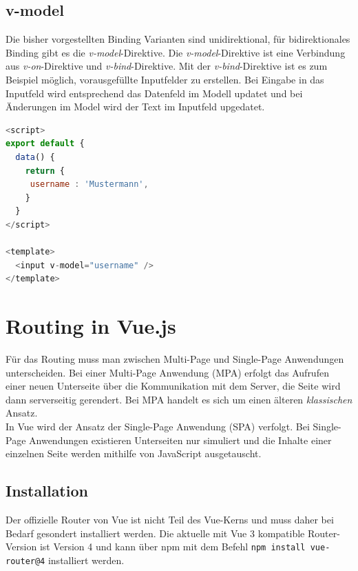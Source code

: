 
\subsection*{v-model}
Die bisher vorgestellten Binding Varianten sind unidirektional,
für bidirektionales Binding gibt es die \emph{v-model}-Direktive.
Die \emph{v-model}-Direktive ist eine Verbindung aus \emph{v-on}-Direktive
und \emph{v-bind}-Direktive.
Mit der \emph{v-bind}-Direktive ist es zum Beispiel möglich, vorausgefüllte Inputfelder zu erstellen.
Bei Eingabe in das Inputfeld wird entsprechend das Datenfeld im Modell updatet
und bei Änderungen im Model wird der Text im Inputfeld upgedatet. \cite{vueComponentV-model}
\begin{lstlisting}[caption={\emph{v-model}-Direktive},language=javascript, label={lst:v-model-Direktive}]
<script>
export default {
  data() {
    return {
     username : 'Mustermann',
    }
  }
</script>

<template>
  <input v-model="username" />
</template>
\end{lstlisting}

\section{Routing in Vue.js}
Für das Routing muss man zwischen Multi-Page und Single-Page Anwendungen unterscheiden.
Bei einer Multi-Page Anwendung (MPA) erfolgt das Aufrufen einer neuen Unterseite über die Kommunikation
mit dem Server, die Seite wird dann serverseitig gerendert.
Bei MPA handelt es sich um einen älteren \emph{klassischen} Ansatz.\cite[S. 262]{kaluvza2018comparison}
\\
In Vue wird der Ansatz der Single-Page Anwendung (SPA) verfolgt.
Bei Single-Page Anwendungen existieren Unterseiten nur simuliert und
die Inhalte einer einzelnen Seite werden mithilfe von JavaScript ausgetauscht. \cite[S. 174-175]{peterke2019}
\subsection*{Installation}
Der offizielle Router von Vue ist nicht Teil des Vue-Kerns und
muss daher bei Bedarf gesondert installiert werden.
Die aktuelle mit Vue 3 kompatible Router-Version ist Version 4 und
kann über npm mit dem Befehl \lstinline{npm install vue-router@4} installiert werden.\cite{vueRouterInstallation}


